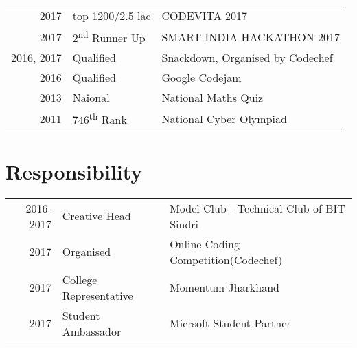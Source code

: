 \documentclass[a4paper]{deedy-resume} %
\begin{document}
\begin{minipage}[t]{0.66\textwidth}
\begin{tabular}{rll}
2017	 & top 1200/2.5 lac & CODEVITA 2017 \\
2017	 & 2\textsuperscript{nd} Runner Up &  SMART INDIA HACKATHON 2017\\
2016, 2017	 & Qualified & Snackdown, Organised by Codechef\\
2016	 & Qualified & Google Codejam\\
2013 & Naional & National Maths Quiz\\
2011 & 746\textsuperscript{th} Rank & National Cyber Olympiad\\
\end{tabular}

\sectionspace %


\section{Responsibility} 

\begin{tabular}{rll}
2016-2017 & Creative Head & Model Club - Technical Club of BIT Sindri\\
2017 & Organised & Online Coding Competition(Codechef)\\
2017 & College Representative & Momentum Jharkhand\\
2017 & Student Ambassador & Micrsoft Student Partner\\
\end{tabular}

\sectionspace %


\end{minipage} %

\end{document}
